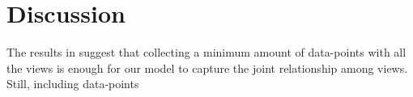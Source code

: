\section{Discussion}
The results in  suggest that collecting a minimum amount of data-points with all the views is enough for our model to capture the joint relationship among views.
Still, including data-points 
